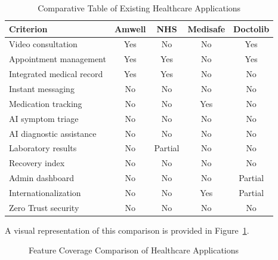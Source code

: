 \documentclass[12pt,a4paper,oneside]{report}
\begin{document}
\begin{table}[H]
\centering
\caption{Comparative Table of Existing Healthcare Applications}
\label{tab:comparative}
\small
\begin{tabular}{|l|c|c|c|c|}
\hline
\textbf{Criterion} & \textbf{Amwell} & \textbf{NHS} & \textbf{Medisafe} & \textbf{Doctolib} \\
\hline
Video consultation        & Yes & No  & No  & Yes \\
\hline
Appointment management    & Yes & Yes & No  & Yes \\
\hline
Integrated medical record & Yes & Yes & No  & No \\
\hline
Instant messaging         & No  & No  & No  & No \\
\hline
Medication tracking       & No  & No  & Yes & No \\
\hline
AI symptom triage         & No  & No  & No  & No \\
\hline
AI diagnostic assistance  & No  & No  & No  & No \\
\hline
Laboratory results        & No  & Partial & No & No \\
\hline
Recovery index            & No  & No  & No  & No \\
\hline
Admin dashboard           & No  & No  & No  & Partial \\
\hline
Internationalization      & No  & No  & Yes & Partial \\
\hline
Zero Trust security       & No  & No  & No  & No \\
\hline
\end{tabular}
\end{table}

A visual representation of this comparison is provided in Figure~\ref{fig:comparative chart}.

\begin{figure}[H]
    \centering
    \caption{Feature Coverage Comparison of Healthcare Applications}
    \label{fig:comparative chart}
\end{figure}
\end{document}
